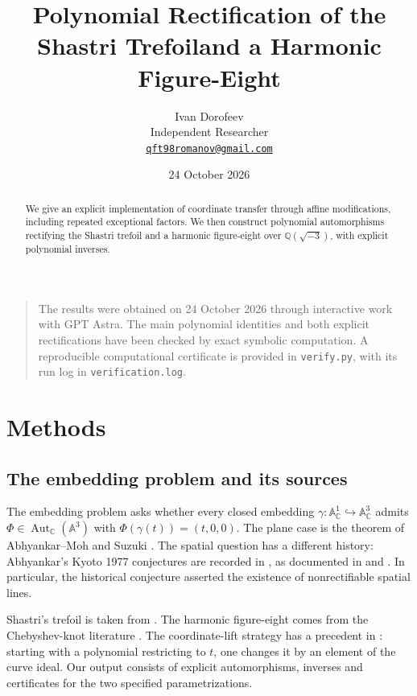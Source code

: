 \documentclass[11pt,a4paper]{article}
\title{\vspace{-15mm}\LARGE\bfseries Polynomial Rectification of the Shastri Trefoil\newline and a Harmonic Figure-Eight}
\author{Ivan Dorofeev\\[3pt]\normalsize Independent Researcher\\\normalsize\href{mailto:qft98romanov@gmail.com}{\texttt{qft98romanov@gmail.com}}}
\date{24 October 2026}
\newcommand{\A}{\mathbb A}
\newcommand{\Q}{\mathbb Q}
\newcommand{\C}{\mathbb C}
\begin{document}
\maketitle
\thispagestyle{empty}
\vspace{-4mm}

\begin{abstract}
We give an explicit implementation of coordinate transfer through affine
modifications, including repeated exceptional factors. We then
construct polynomial automorphisms rectifying the Shastri trefoil and a
harmonic figure-eight over $\Q(\sqrt{-3})$, with explicit polynomial inverses.
\end{abstract}

\smallskip
\begin{quote}\small
The results were obtained on 24 October 2026 through interactive work with
GPT Astra. The main polynomial identities and both explicit rectifications
have been checked by exact symbolic computation. A reproducible
computational certificate is provided in \texttt{verify.py}, with its run
log in \texttt{verification.log}.
\end{quote}

\section{Methods}

\subsection{The embedding problem and its sources}

The embedding problem asks whether every closed embedding
$\gamma:\A^1_{\C}\hookrightarrow\A^3_{\C}$ admits
$\Phi\in\operatorname{Aut}_{\C}(\A^3)$ with
$\Phi(\gamma(t))=(t,0,0)$. The plane case is the theorem of
Abhyankar--Moh and Suzuki \cite{AM,Suzuki}. The spatial question has a
different history: Abhyankar's Kyoto 1977 conjectures are recorded in
\cite[Chapter 11, pp.~413--414]{Abhyankar}, as documented in
\cite[Introduction, pp.~115--116]{Craighero} and
\cite[\S1, p.~11]{Shastri}. In particular, the historical conjecture
asserted the existence of nonrectifiable spatial lines.

Shastri's trefoil is taken from \cite[\S3, Example~1]{Shastri}.
The harmonic figure-eight comes from the Chebyshev-knot literature
\cite[Introduction, Definition~1.2 and the following paragraph]{KP}.
The coordinate-lift strategy has a precedent in
\cite[Proposition~3, pp.~117--118]{Craighero}: starting with a polynomial
restricting to $t$, one changes it by an element of the curve ideal.
Our output consists of explicit automorphisms, inverses and certificates
for the two specified parametrizations.
\end{document}
